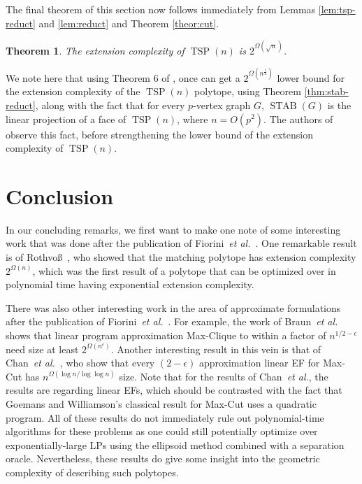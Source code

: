 \documentclass{article}
\makeatletter
\newtheorem{theorem}{\sc Theorem}
\theoremstyle{definition}
\theoremstyle{remark}
\newcommand{\cetal}{\textit{et al.\@}}  %
\newcommand{\TSP}{\operatorname{TSP}}
\newcommand{\STAB}{\operatorname{STAB}}
\makeatother
\begin{document}
The final theorem of this section now follows immediately from Lemmas \ref{lem:tsp-reduct} and \ref{lem:reduct} and Theorem \ref{theor:cut}.

\begin{theorem}
The extension complexity of $\TSP(n)$ is $2^{\Omega\left(\sqrt{n}\right)}$.
\end{theorem}

We note here that using Theorem $6$ of \cite{yannakakis}, once can get a $2^{\Omega\left(n^{\frac{1}{4}}\right)}$ lower bound for the extension complexity of the $\TSP(n)$ polytope, using Theorem \ref{thm:stab-reduct}, along with the fact that for every $p$-vertex graph $G$, $\STAB(G)$ is the linear projection of a face of $\TSP(n)$, where $n = O(p^2)$. The authors of \cite{fiorini} observe this fact, before strengthening the lower bound of the extension complexity of $\TSP(n)$.

\section{Conclusion}

In our concluding remarks, we first want to make one note of some interesting work that was done after the publication of Fiorini~\cetal~\cite{fiorini}. One remarkable result is of Rothvo\ss~\cite{rothvoss2017}, who showed that the matching polytope has extension complexity $2^{\Omega(n)}$, which was the first result of a polytope that can be optimized over in polynomial time having exponential extension complexity.

There was also other interesting work in the area of approximate formulations after the publication of Fiorini~\cetal~\cite{fiorini}. For example, the work of Braun~\cetal~\cite{braun} shows that linear program approximation Max-Clique to within a factor of $n^{1/2-\epsilon}$ need size at least $2^{\Omega(n^\epsilon)}$. Another interesting result in this vein is that of Chan~\cetal~\cite{chan}, who show that every $(2-\epsilon)$ approximation linear EF for Max-Cut has $n^{\Omega(\log n / \log \log n)}$ size. Note that for the results of Chan~\cetal, the results are regarding linear EFs, which should be contrasted with the fact that Goemans and Williamson's classical result for Max-Cut uses a quadratic program. All of these results do not immediately rule out polynomial-time algorithms for these problems as one could still potentially optimize over exponentially-large LPs using the ellipsoid method combined with a separation oracle. Nevertheless, these results do give some insight into the geometric complexity of describing such polytopes.



\end{document}
